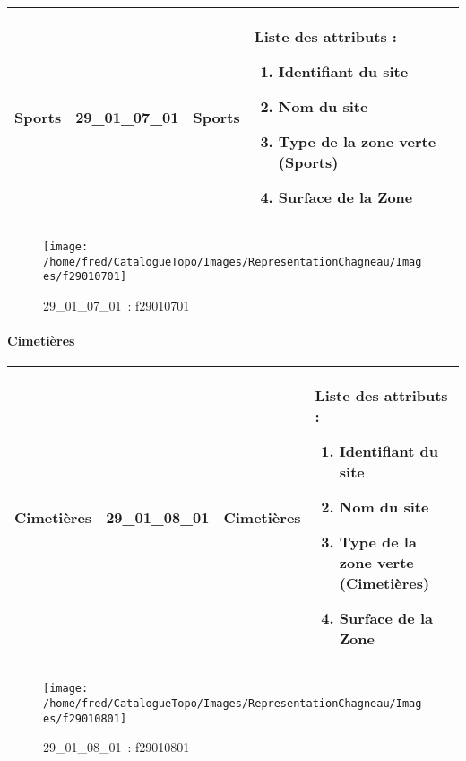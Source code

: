 \documentclass[12pt,titlepage]{book}
\begin{document}
\renewcommand{\arraystretch}{1.2}
\begin{supertabular}{|p{10cm}|c|p{13cm}|p{12cm}|}
 Sports & 29\_01\_07\_01 & Sports & Liste des attributs :
\begin{enumerate}
  \item Identifiant du site  \item Nom du site  \item Type de la zone verte (Sports)  \item Surface de la Zone\end{enumerate}
\\
\hline
\end{supertabular}
\begin{figure}[h!]
  \hfill         %
  \begin{minipage}[t]{3cm}
    \begin{center}
      \texttt{[image: /home/fred/CatalogueTopo/Images/RepresentationChagneau/Images/f29010701]}
      \caption[~29\_01\_07\_01]{\small{29\_01\_07\_01~:} \tiny{f29010701}}\label{f29010701}
    \end{center}
  \end{minipage}
\end{figure}


\paragraph{Cimetières}
\noindent
\vspace{\baselineskip}

\renewcommand{\arraystretch}{1.2}
\begin{supertabular}{|p{10cm}|c|p{13cm}|p{12cm}|}
 Cimetières & 29\_01\_08\_01 & Cimetières & Liste des attributs :
\begin{enumerate}
  \item Identifiant du site  \item Nom du site  \item Type de la zone verte (Cimetières)  \item Surface de la Zone\end{enumerate}
\\
\hline
\end{supertabular}
\begin{figure}[h!]
  \hfill         %
  \begin{minipage}[t]{3cm}
    \begin{center}
      \texttt{[image: /home/fred/CatalogueTopo/Images/RepresentationChagneau/Images/f29010801]}
      \caption[~29\_01\_08\_01]{\small{29\_01\_08\_01~:} \tiny{f29010801}}\label{f29010801}
    \end{center}
  \end{minipage}
\end{figure}
\end{document}
